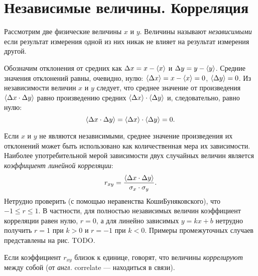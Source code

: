 %

\section{Независимые величины. Корреляция}

Рассмотрим две физические величины $x$ и $y$. Величины называют
\emph{независимыми} если результат измерения одной из них никак не
влияет на результат измерения другой.

Обозначим отклонения от средних как $\Delta x=x-\left<x\right>$ и $\Delta
y=y-\left<y\right>$.
Средние значения отклонений равны, очевидно, нулю: $\left<\Delta
x\right>=x-\left<x\right>=0$,
$\left<\Delta y\right>=0$. Из независимости величин $x$ и $y$ следует,
что среднее значение от произведения $\left<\Delta x\cdot\Delta y\right>$
равно произведению средних $\left<\Delta x\right>\cdot\left<\Delta y\right>$
и, следовательно, равно нулю:
\begin{equation}
\left<\Delta x\cdot\Delta y\right>=\left<\Delta x\right>\cdot\left<\Delta
y\right>=0.\label{eq:indep}
\end{equation}

Если $x$ и $y$ не являются независимыми, среднее значение произведения
их отклонений может быть использовано как количественная мера их зависимости.
Наиболее употребительной мерой зависимости двух случайных величин
является \emph{коэффициент линейной корреляции}:
\begin{equation}
r_{xy}=\frac{\left<\Delta x\cdot\Delta
y\right>}{\sigma_{x}\cdot\sigma_{y}}.\label{eq:pearson}
\end{equation}
Нетрудно проверить (с помощью неравенства Коши\textendash Буняковского),
что $-1\le r\le1$. В частности, для полностью независимых величин
коэффициент корреляции равен нулю, $r=0$, а для линейно зависимых
$y=kx+b$ нетрудно получить $r=1$ при $k>0$ и $r=-1$ при $k<0$.
Примеры промежуточных случаев представлены на рис. TODO.

Если коэффициент $r_{xy}$ близок к единице, говорят, что величины
\emph{коррелируют} между собой (от \emph{англ.} correlate ---
находиться в связи).

